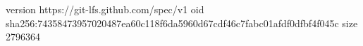 version https://git-lfs.github.com/spec/v1
oid sha256:74358473957020487ea60c118f6da5960d67cdf46c7fabc01afdf0dfbf4f045c
size 2796364
